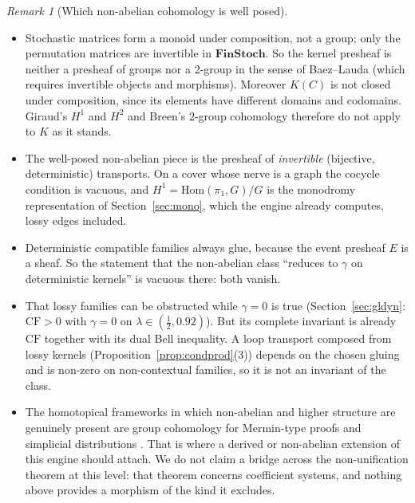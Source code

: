 \documentclass[11pt]{article}
\theoremstyle{definition}
\theoremstyle{remark}
\newtheorem{remark}[theorem]{Remark}
\newcommand{\CF}{\mathrm{CF}}
\begin{document}
\begin{remark}[Which non-abelian cohomology is well posed]\label{rem:nonabelian}
\leavevmode
\begin{itemize}
  \item Stochastic matrices form a monoid under composition, not a group; only the permutation matrices are invertible in $\mathbf{FinStoch}$. So the kernel presheaf is neither a presheaf of groups nor a 2-group in the sense of Baez--Lauda (which requires invertible objects and morphisms). Moreover $K(C)$ is not closed under composition, since its elements have different domains and codomains. Giraud's $H^1$ and $H^2$ \cite{giraud} and Breen's 2-group cohomology \cite{breen} therefore do not apply to $K$ as it stands.
  \item The well-posed non-abelian piece is the presheaf of \emph{invertible} (bijective, deterministic) transports. On a cover whose nerve is a graph the cocycle condition is vacuous, and $H^1=\mathrm{Hom}(\pi_1,G)/G$ is the monodromy representation of Section~\ref{sec:mono}, which the engine already computes, lossy edges included.
  \item Deterministic compatible families always glue, because the event presheaf $E$ is a sheaf. So the statement that the non-abelian class ``reduces to $\gamma$ on deterministic kernels'' is vacuous there: both vanish.
  \item That lossy families can be obstructed while $\gamma=0$ is true (Section~\ref{sec:gldyn}: $\CF>0$ with $\gamma=0$ on $\lambda\in(\tfrac12,0.92)$). But its complete invariant is already $\CF$ together with its dual Bell inequality. A loop transport composed from lossy kernels (Proposition~\ref{prop:condprod}(3)) depends on the chosen gluing and is non-zero on non-contextual families, so it is not an invariant of the class.
  \item The homotopical frameworks in which non-abelian and higher structure are genuinely present are group cohomology for Mermin-type proofs \cite{orbr17} and simplicial distributions \cite{kharoofokay}. That is where a derived or non-abelian extension of this engine should attach. We do not claim a bridge across the non-unification theorem at this level: that theorem concerns coefficient systems, and nothing above provides a morphism of the kind it excludes.
\end{itemize}
\end{remark}
\end{document}
